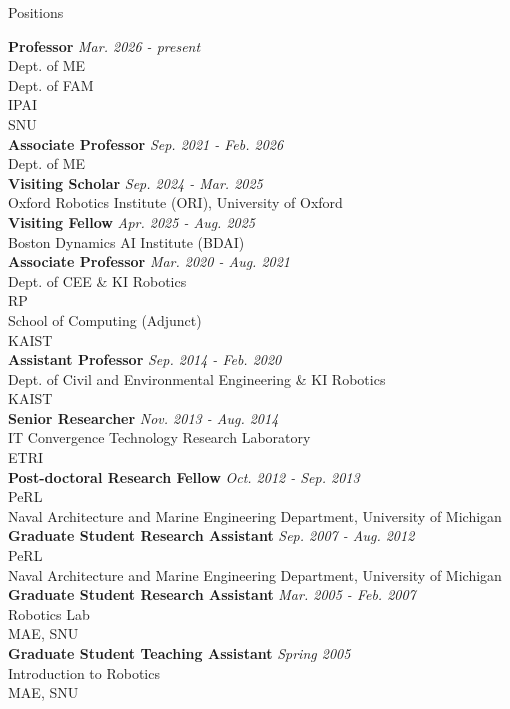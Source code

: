 \begin{rSection}{Positions}

{\bf Professor} \hfill {\em Mar. 2026 - present} \\
Dept. of \ac{ME}\\
Dept. of \ac{FAM}\\
\ac{IPAI}\\
\acf{SNU}\\

{\bf Associate Professor} \hfill {\em Sep. 2021 - Feb. 2026} \\
Dept. of \acf{ME}\\

{\bf Visiting Scholar} \hfill {\em Sep. 2024 - Mar. 2025} \\
Oxford Robotics Institute (ORI), University of Oxford\\

{\bf Visiting Fellow} \hfill {\em Apr. 2025 - Aug. 2025} \\
Boston Dynamics AI Institute (BDAI)\\

{\bf Associate Professor} \hfill {\em Mar. 2020 - Aug. 2021} \\
Dept. of \ac{CEE} \& KI Robotics\\
\ac{RP}\\
School of Computing (Adjunct)\\
\acf{KAIST}\\

{\bf Assistant Professor} \hfill {\em Sep. 2014 - Feb. 2020} \\
Dept. of Civil and Environmental Engineering \& KI Robotics\\
\acf{KAIST}\\

{\bf Senior Researcher} \hfill {\em Nov. 2013 - Aug. 2014} \\
IT Convergence Technology Research Laboratory\\
\acf{ETRI}\\

{\bf Post-doctoral Research Fellow} \hfill {\em Oct. 2012 - Sep. 2013} \\
\acf{PeRL}\\
Naval Architecture and Marine Engineering Department, University of Michigan\\

{\bf Graduate Student Research Assistant} \hfill {\em Sep. 2007 - Aug. 2012} \\
\acf{PeRL}\\
Naval Architecture and Marine Engineering Department, University of Michigan\\

{\bf Graduate Student Research Assistant} \hfill {\em Mar. 2005 - Feb. 2007} \\
Robotics Lab\\
\acf{MAE}, \acf{SNU}\\

{\bf Graduate Student Teaching Assistant} \hfill {\em Spring 2005} \\
Introduction to Robotics\\
\acf{MAE}, \acf{SNU}\\

\end{rSection}
